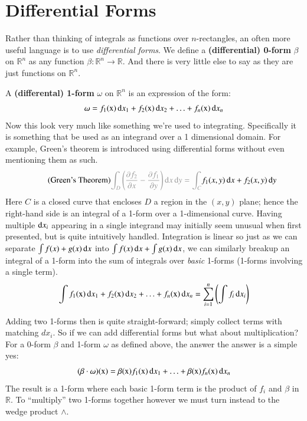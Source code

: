 
\section{Differential Forms}

Rather than thinking of integrals as functions over $n$-rectangles, an often more useful language is to use 
\emph{differential forms}.
We define a \textbf{(differential) 0-form} $\beta$ on $\mathbb{R}^n$ as any function 
$\beta : \mathbb{R}^n \to \mathbb{R}$.
And there is very little else to say as they are just functions on $\mathbb{R}^n$.



A \textbf{(differental) 1-form} $\omega$ on $\mathbb{R}^n$ is an expression of the form:
\begin{equation}
	\omega = f_1(\text{x}) \mathop{}\!\mathrm{d} x_1 + f_2(\text{x}) \mathop{}\!\mathrm{d} x_2 + \ldots + f_n(\text{x}) \mathop{}\!\mathrm{d} x_n
\end{equation}
Now this look very much like something we're used to integrating.
Specifically it is something that be used as an integrand over a 1 dimensional domain.
For example, Green's theorem is introduced using differential forms without even mentioning them as such.
\begin{equation}
	\tag{Green's Theorem}
	\textcolor{black!40}{
		\int_D \left( \frac{\partial f_2}{\partial x} - \frac{\partial f_1}{\partial y}  \right) \diff x \diff y 
		=\int_{C}
	} f_1(x,y) \diff x + f_2(x,y) \diff y
\end{equation}
Here $C$ is a closed curve that encloses $D$ a region in the $(x,y)$ plane; hence the right-hand side is an integral of
a 1-form over a 1-dimensional curve.
Having multiple $\mathop{}\!\mathrm{d} x_i$ appearing in a single integrand may initially seem unusual when first presented, 
but is quite intuitively handled.
Integration is linear so just as we can separate $\int f(x) + g(x) \mathop{}\!\mathrm{d} x$ into $\int f(x) \mathop{}\!\mathrm{d} x + \int g(x) \mathop{}\!\mathrm{d} x$, 
we can similarly breakup an integral of a 1-form into the sum of integrals over \emph{basic} 1-forms 
(1-forms involving a single term).
\begin{equation}
	\int f_1(\text{x}) \mathop{}\!\mathrm{d} x_1 
		+ f_2(\text{x}) \mathop{}\!\mathrm{d} x_2 
		+ \ldots 
		+ f_n(\text{x}) \mathop{}\!\mathrm{d} x_n
	=	\sum_{i=1}^n \left( \int f_i \mathop{}\!\mathrm{d} x_i \right)
\end{equation}


Adding two 1-forms then is quite straight-forward; simply collect terms with matching $dx_i$.
So if we can add differential forms but what about multiplication?
For a 0-form $\beta$ and 1-form $\omega$ as defined above, the answer the answer is a simple yes:
\begin{equation}
	(\beta \cdot \omega)(\text{x}) 
		= \beta(\text{x})f_1(\text{x}) \mathop{}\!\mathrm{d} x_1 
		+ \ldots  
		+ \beta(\text{x})f_n(\text{x}) \mathop{}\!\mathrm{d} x_n
\end{equation}
The result is a 1-form where each basic 1-form term is the product of $f_i$ and $\beta$ in $\mathbb{R}$.
To ``multiply'' two 1-forms together however we must turn instead to the wedge product $\wedge$.


